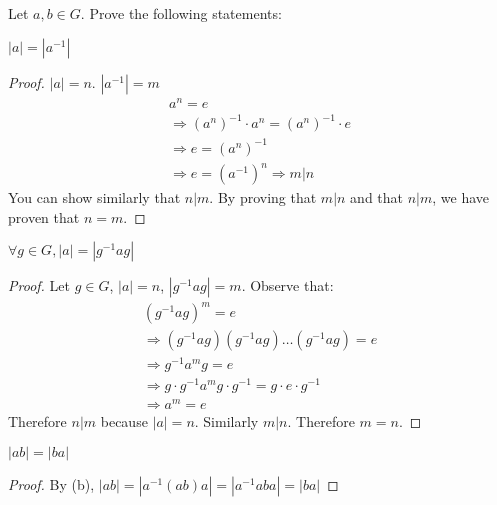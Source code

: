 \documentclass[11pt]{scrartcl}
\begin{document}
\begin{example}
  Let $a, b \in G$. Prove the following statements:
  \begin{enumerate}[label=(\alph*)]
    \ii
    $|a| = |a^{-1}|$ 
    \begin{proof}
      $|a| = n$. $|a^{-1}| = m$
      \begin{gather*}
        a^n = e \\
        \Rightarrow (a^n)^{-1} \cdot a^n = (a^n)^{-1} \cdot e \\
        \Rightarrow e = (a^n)^{-1} \\
        \Rightarrow e = (a^{-1})^n
        \Rightarrow m | n
      \end{gather*}
      You can show similarly that $n | m$. By proving that $m | n$ and that $n | m$, we have proven that $n = m$.
    \end{proof}
    \ii
    $\forall g \in G, |a| = |g^{-1}ag|$ 
    \begin{proof}
      Let $g \in G$, $|a| = n$, $|g^{-1}ag| = m$. Observe that:
      \begin{gather*}
        (g^{-1}ag)^m = e \\
        \Rightarrow (g^{-1}ag)(g^{-1}ag)\dots(g^{-1}ag) = e \\
        \Rightarrow g^{-1}a^mg = e \\
        \Rightarrow g \cdot g^{-1} a^m g \cdot g^{-1} = g \cdot e \cdot g^{-1} \\
        \Rightarrow a^m = e
      \end{gather*}
      Therefore $n | m$ because $|a| = n$. Similarly $m | n$. Therefore $m = n$.
    \end{proof}
    \ii
    $|ab| = |ba|$ 
    \begin{proof}
      By (b), $|ab| = |a^{-1}(ab)a| = |a^{-1}aba| = |ba|$
    \end{proof}
  \end{enumerate}
\end{example}
\end{document}
